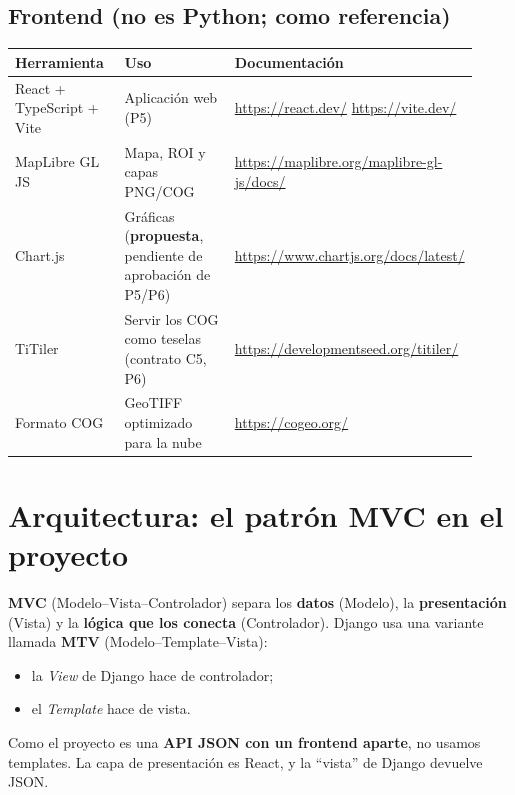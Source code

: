 \documentclass[11pt,a4paper]{article}
\begin{document}
\subsection{Frontend (no es Python; como referencia)}

\begin{longtable}{p{0.26\linewidth}p{0.30\linewidth}p{0.36\linewidth}}
\toprule
\textbf{Herramienta} & \textbf{Uso} & \textbf{Documentación} \\
\midrule
\endhead
React + TypeScript + Vite & Aplicación web (P5) & \url{https://react.dev/} \url{https://vite.dev/} \\
MapLibre GL JS & Mapa, ROI y capas PNG/COG & \url{https://maplibre.org/maplibre-gl-js/docs/} \\
Chart.js & Gráficas (\textbf{propuesta}, pendiente de aprobación de P5/P6) & \url{https://www.chartjs.org/docs/latest/} \\
TiTiler & Servir los COG como teselas (contrato C5, P6) & \url{https://developmentseed.org/titiler/} \\
Formato COG & GeoTIFF optimizado para la nube & \url{https://cogeo.org/} \\
\bottomrule
\end{longtable}

\section{Arquitectura: el patrón MVC en el proyecto}

\textbf{MVC} (Modelo--Vista--Controlador) separa los \textbf{datos} (Modelo), la \textbf{presentación} (Vista) y la
\textbf{lógica que los conecta} (Controlador). Django usa una variante llamada \textbf{MTV} (Modelo--Template--Vista):
\begin{itemize}
  \item la \emph{View} de Django hace de controlador;
  \item el \emph{Template} hace de vista.
\end{itemize}

Como el proyecto es una \textbf{API JSON con un frontend aparte}, no usamos templates. La capa de presentación es React, y la
``vista'' de Django devuelve JSON.
\end{document}
